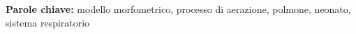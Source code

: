 
\begin{tcolorbox}[arc=0pt, boxrule=0pt, colback=bluePoli!60, width=\textwidth, colupper=white]
  \textbf{Parole chiave:} modello morfometrico, processo di aerazione, polmone, neonato, sistema respiratorio
\end{tcolorbox}
